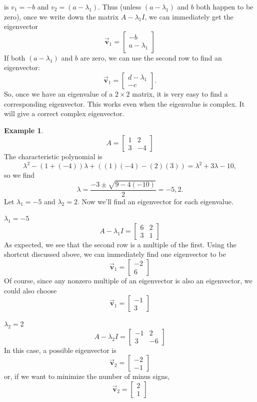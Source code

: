 \documentclass[reqno]{immbook}
\newcommand{\BV}{\vec{\textbf{v}}}
\numberwithin{equation}{chapter}
\numberwithin{question}{section}
\numberwithin{theorem}{chapter}
\numberwithin{figure}{chapter}
\theoremstyle{definition}
\newtheorem{example}{Example}[section]
\begin{document}
is $v_1=-b$ and $v_2 = (a-\lambda_1)$.
Thus (unless $(a-\lambda_1)$ and $b$ both happen to be
zero), once we write down the matrix $A-\lambda_1 I$,
we can immediately get the eigenvector
\[
   \BV_1 = \begin{bmatrix} -b \\ a-\lambda_1 \end{bmatrix}
\]
If both $(a-\lambda_1)$ and $b$ are zero, we can use the
second row to find an eigenvector:
\[
   \BV_1 = \begin{bmatrix} d-\lambda_1 \\ -c \end{bmatrix}.
\]
So, once we have an eigenvalue
of a $2\times 2$ matrix, it is very easy to find
a corresponding eigenvector.
This works even when the eigenvalue is complex.
It will give a correct complex eigenvector.

\begin{example}
\[
   A = \begin{bmatrix} 1 & 2 \\ 3 & -4 \end{bmatrix}
\]
The characteristic polynomial is
\[
   \lambda^2 - (1+(-4))\lambda + ((1)(-4)-(2)(3)) = \lambda^2 + 3\lambda - 10,
\]
so we find
\[
  \lambda = \frac{-3\pm\sqrt{9-4(-10)}}{2} = -5, 2.
\]
Let $\lambda_1 = -5$ and $\lambda_2 = 2$.
Now we'll find an eigenvector for each eigenvalue.

\medskip
\noindent
\underline{$\lambda_1 = -5$}
\[
   A-\lambda_1 I = \begin{bmatrix}
                   6 & 2 \\ 3 & 1
                   \end{bmatrix}
\]
As expected, we see that the second row
is a multiple of the first. Using the shortcut discussed
above, we can immediately find one eigenvector to be
\[
   \BV_1 = \begin{bmatrix} -2 \\ 6 \end{bmatrix}
\]
Of course, since any nonzero multiple of an eigenvector
is also an eigenvector, we could also choose
\[
   \BV_1 = \begin{bmatrix} -1 \\ 3 \end{bmatrix}
\]

\medskip
\noindent
\underline{$\lambda_2 = 2$}
\[
  A - \lambda_2 I = \begin{bmatrix}
                      -1 & 2 \\ 3 & -6
                    \end{bmatrix}
\]
In this case, a possible eigenvector is
\[
  \BV_2 = \begin{bmatrix} -2 \\ -1 \end{bmatrix}
\]
or, if we want to minimize the number of minus signs,
\[
  \BV_2 = \begin{bmatrix} 2 \\ 1 \end{bmatrix}
\]
\end{example}
\end{document}
